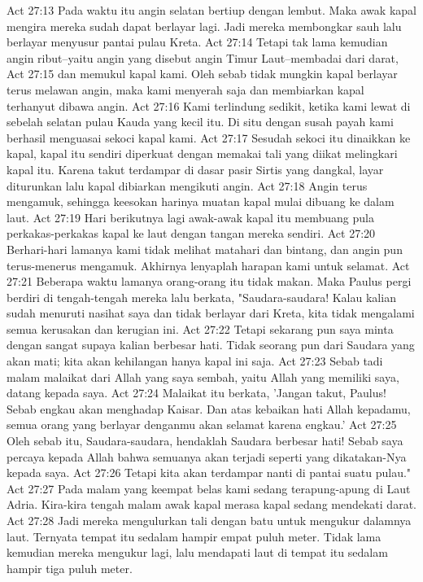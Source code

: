 Act 27:13  Pada waktu itu angin selatan bertiup dengan lembut. Maka awak kapal mengira mereka sudah dapat berlayar lagi. Jadi mereka membongkar sauh lalu berlayar menyusur pantai pulau Kreta.
Act 27:14  Tetapi tak lama kemudian angin ribut--yaitu angin yang disebut angin Timur Laut--membadai dari darat,
Act 27:15  dan memukul kapal kami. Oleh sebab tidak mungkin kapal berlayar terus melawan angin, maka kami menyerah saja dan membiarkan kapal terhanyut dibawa angin.
Act 27:16  Kami terlindung sedikit, ketika kami lewat di sebelah selatan pulau Kauda yang kecil itu. Di situ dengan susah payah kami berhasil menguasai sekoci kapal kami.
Act 27:17  Sesudah sekoci itu dinaikkan ke kapal, kapal itu sendiri diperkuat dengan memakai tali yang diikat melingkari kapal itu. Karena takut terdampar di dasar pasir Sirtis yang dangkal, layar diturunkan lalu kapal dibiarkan mengikuti angin.
Act 27:18  Angin terus mengamuk, sehingga keesokan harinya muatan kapal mulai dibuang ke dalam laut.
Act 27:19  Hari berikutnya lagi awak-awak kapal itu membuang pula perkakas-perkakas kapal ke laut dengan tangan mereka sendiri.
Act 27:20  Berhari-hari lamanya kami tidak melihat matahari dan bintang, dan angin pun terus-menerus mengamuk. Akhirnya lenyaplah harapan kami untuk selamat.
Act 27:21  Beberapa waktu lamanya orang-orang itu tidak makan. Maka Paulus pergi berdiri di tengah-tengah mereka lalu berkata, "Saudara-saudara! Kalau kalian sudah menuruti nasihat saya dan tidak berlayar dari Kreta, kita tidak mengalami semua kerusakan dan kerugian ini.
Act 27:22  Tetapi sekarang pun saya minta dengan sangat supaya kalian berbesar hati. Tidak seorang pun dari Saudara yang akan mati; kita akan kehilangan hanya kapal ini saja.
Act 27:23  Sebab tadi malam malaikat dari Allah yang saya sembah, yaitu Allah yang memiliki saya, datang kepada saya.
Act 27:24  Malaikat itu berkata, 'Jangan takut, Paulus! Sebab engkau akan menghadap Kaisar. Dan atas kebaikan hati Allah kepadamu, semua orang yang berlayar denganmu akan selamat karena engkau.'
Act 27:25  Oleh sebab itu, Saudara-saudara, hendaklah Saudara berbesar hati! Sebab saya percaya kepada Allah bahwa semuanya akan terjadi seperti yang dikatakan-Nya kepada saya.
Act 27:26  Tetapi kita akan terdampar nanti di pantai suatu pulau."
Act 27:27  Pada malam yang keempat belas kami sedang terapung-apung di Laut Adria. Kira-kira tengah malam awak kapal merasa kapal sedang mendekati darat.
Act 27:28  Jadi mereka mengulurkan tali dengan batu untuk mengukur dalamnya laut. Ternyata tempat itu sedalam hampir empat puluh meter. Tidak lama kemudian mereka mengukur lagi, lalu mendapati laut di tempat itu sedalam hampir tiga puluh meter.

